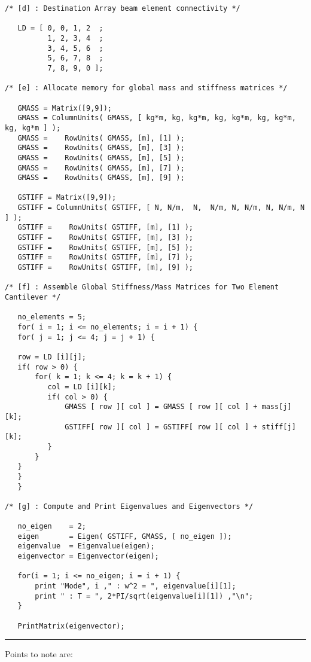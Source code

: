 \begin{footnotesize}
\begin{verbatim}
/* [d] : Destination Array beam element connectivity */

   LD = [ 0, 0, 1, 2  ;
          1, 2, 3, 4  ; 
          3, 4, 5, 6  ; 
          5, 6, 7, 8  ; 
          7, 8, 9, 0 ]; 

/* [e] : Allocate memory for global mass and stiffness matrices */

   GMASS = Matrix([9,9]);
   GMASS = ColumnUnits( GMASS, [ kg*m, kg, kg*m, kg, kg*m, kg, kg*m, kg, kg*m ] );
   GMASS =    RowUnits( GMASS, [m], [1] );
   GMASS =    RowUnits( GMASS, [m], [3] );
   GMASS =    RowUnits( GMASS, [m], [5] );
   GMASS =    RowUnits( GMASS, [m], [7] ); 
   GMASS =    RowUnits( GMASS, [m], [9] ); 

   GSTIFF = Matrix([9,9]);
   GSTIFF = ColumnUnits( GSTIFF, [ N, N/m,  N,  N/m, N, N/m, N, N/m, N ] );
   GSTIFF =    RowUnits( GSTIFF, [m], [1] );
   GSTIFF =    RowUnits( GSTIFF, [m], [3] );
   GSTIFF =    RowUnits( GSTIFF, [m], [5] );
   GSTIFF =    RowUnits( GSTIFF, [m], [7] );
   GSTIFF =    RowUnits( GSTIFF, [m], [9] );

/* [f] : Assemble Global Stiffness/Mass Matrices for Two Element Cantilever */

   no_elements = 5;
   for( i = 1; i <= no_elements; i = i + 1) {
   for( j = 1; j <= 4; j = j + 1) {

   row = LD [i][j];
   if( row > 0) {
       for( k = 1; k <= 4; k = k + 1) {
          col = LD [i][k];
          if( col > 0) {
              GMASS [ row ][ col ] = GMASS [ row ][ col ] + mass[j][k];
              GSTIFF[ row ][ col ] = GSTIFF[ row ][ col ] + stiff[j][k];
          }
       }
   } 
   }
   }

/* [g] : Compute and Print Eigenvalues and Eigenvectors */

   no_eigen    = 2;
   eigen       = Eigen( GSTIFF, GMASS, [ no_eigen ]);
   eigenvalue  = Eigenvalue(eigen);
   eigenvector = Eigenvector(eigen);

   for(i = 1; i <= no_eigen; i = i + 1) {
       print "Mode", i ," : w^2 = ", eigenvalue[i][1];
       print " : T = ", 2*PI/sqrt(eigenvalue[i][1]) ,"\n";
   }

   PrintMatrix(eigenvector);
\end{verbatim}
\rule{6.25 in}{0.035 in}
\end{footnotesize}

\vspace{0.15 in}\noindent
Points to note are:

